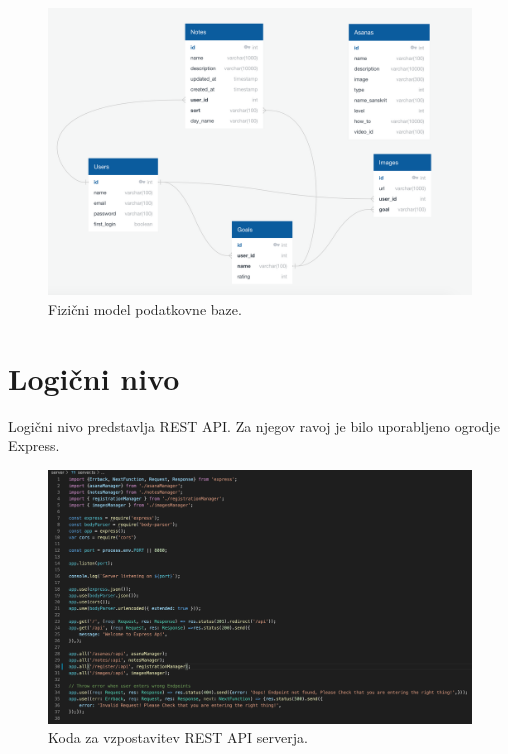 \documentclass[a4paper, 12pt]{book}
\begin{document}
\begin{figure}[htbp]
\begin{center}
\includegraphics[scale=0.38]{diagram.png}
\end{center}
\caption{Fizični model podatkovne baze.}
\label{baza}
\end{figure}

\section{Logični nivo}
Logični nivo predstavlja REST API. Za njegov ravoj je bilo uporabljeno ogrodje Express.

\begin{figure}[htbp]
\begin{center}
\includegraphics[scale=0.33]{server.jpg} 
\end{center}
\caption{Koda za vzpostavitev REST API serverja.}
\label{server}
\end{figure}
\end{document}
